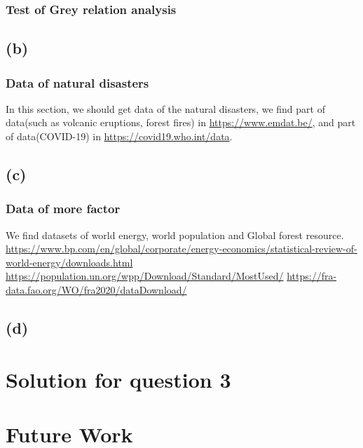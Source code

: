 \documentclass{apmcmthesis}
\begin{document}
\subsubsection{Test of Grey relation analysis}



\subsection{(b)}
\subsubsection{Data of natural disasters}
In this section, we should get data of the natural disasters, we find part of data(such as volcanic eruptions, forest fires) in \url{https://www.emdat.be/}, and part of data(COVID-19) in \url{https://covid19.who.int/data}.




\subsection{(c)}
\subsubsection{Data of more factor}
We find datasets of world energy, world population and Global forest resource. 
\url{https://www.bp.com/en/global/corporate/energy-economics/statistical-review-of-world-energy/downloads.html}
\url{https://population.un.org/wpp/Download/Standard/MostUsed/}
\url{https://fra-data.fao.org/WO/fra2020/dataDownload/} 

\subsubsection{}


\subsection{(d)}



\newpage
\section{Solution for question 3}



\section{Future Work}
\end{document}

